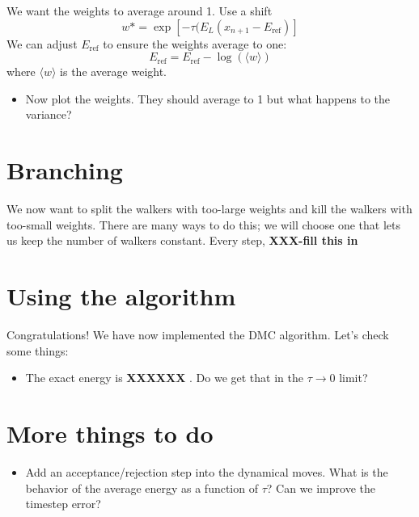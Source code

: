 \documentclass[12pt]{article}
\begin{document}
We want the weights to average around 1.
Use a shift 
\begin{equation}
w*=	\exp[-\tau (E_L(x_{n+1}-E_{\text{ref}})] 
\end{equation}
We can adjust $E_{\text {ref}}$ to ensure the weights average to one:
\begin{equation}
E_{\text{ref}}=E_{\text{ref}}-\log(\langle w \rangle) 
\end{equation}
where $\langle w \rangle$ is the average weight. 

\begin{itemize}
\item Now plot the weights. They should average to 1 but what happens to the variance?
\end{itemize}

\section{Branching} 

We now want to split the walkers with too-large weights and kill the walkers with too-small weights. 
There are many ways to do this; we will choose one that lets us keep the number of walkers constant. 
Every step, 
{\bf XXX-fill this in} 

\section{Using the algorithm}
Congratulations! We have now implemented the DMC algorithm. 
Let's check some things:

\begin{itemize}
\item The exact energy is {\bf XXXXXX }. Do we get that in the $\tau\rightarrow0$ limit?
\end{itemize}

\section{More things to do}
\begin{itemize}
\item Add an acceptance/rejection step into the dynamical moves. What is the behavior of the average energy as a function of $\tau$? Can we improve the timestep error?	
\end{itemize}
\end{document}
